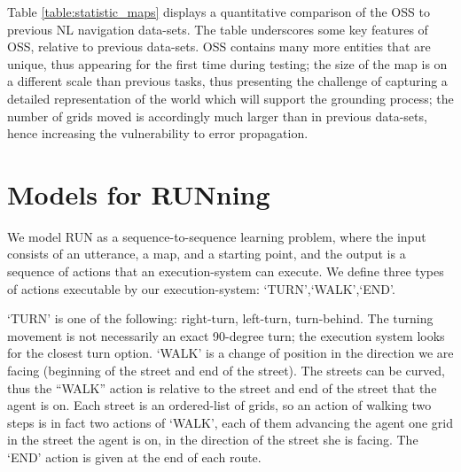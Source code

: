 \documentclass[11pt,a4paper]{article}
\begin{document}
 Table \ref{table:statistic_maps} displays a quantitative comparison of the OSS to previous NL navigation data-sets.  
 The table underscores some key features of OSS, relative to previous data-sets.
 OSS contains many more entities that are unique, thus appearing for the first time during testing; the size of the map is on a different scale than previous tasks, thus presenting the challenge of capturing a detailed representation of the world which will support the grounding process; the number of grids moved is accordingly much larger than in previous data-sets, hence increasing the vulnerability to error propagation.




\section{Models for RUNning}
\label{models}



We model RUN as a sequence-to-sequence learning problem, where the input consists of an utterance, a map, and a starting point, and the output is a sequence of actions that an execution-system can execute.   We define three types of actions executable by our execution-system:
\enquote*{TURN},\enquote*{WALK},\enquote*{END}.%

\enquote*{TURN} is one of the following: right-turn, left-turn, turn-behind. The turning movement is not necessarily an exact 90-degree turn; the execution system looks for the closest turn option. 
\enquote*{WALK} is a change of position in the direction we are facing (beginning of the street and end of the street). The streets can be curved, thus the \enquote{WALK} action is relative to the street and end of the street that the agent is on. Each street is an ordered-list of grids, so an action of walking two steps is in fact two actions of \enquote*{WALK}, each of them advancing the agent one grid in the  street the agent is on, in the direction of the street she is facing.
The \enquote*{END} action is given at the end of each route.
 
\end{document}
